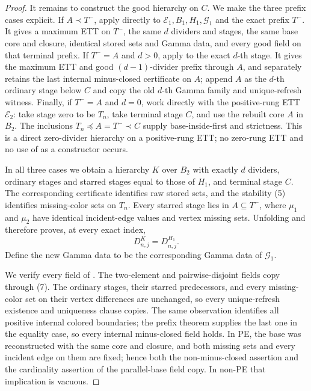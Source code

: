 \begin{proof}
It remains to construct the good hierarchy on $C$.  We make the three
prefix cases explicit.  If $A\prec T^-$, apply directly
 to
$\mathcal E_1,B_1,H_1,\mathcal G_1$ and the exact prefix $T^-$.  It gives
a maximum ETT on $T^-$, the same $d$ dividers and stages, the same base
core and closure, identical stored sets and Gamma data, and every good
field on that terminal prefix.  If $T^-=A$ and $d>0$, apply
 to the exact $d$-th stage.  It
gives the maximum ETT and good $(d-1)$-divider prefix through $A$, and
separately retains the last internal minus-closed certificate on $A$;
append $A$ as the $d$-th ordinary stage below $C$ and copy the old
$d$-th Gamma family and unique-refresh witness.  Finally, if $T^-=A$ and
$d=0$, work directly with the positive-rung ETT $\mathcal E_2$: take
stage zero to be $T_n$, take terminal stage $C$, and use the rebuilt core
$A$ in $B_2$.  The inclusions $T_n\preccurlyeq A=T^-\prec C$ supply
base-inside-first and strictness.  This is a direct zero-divider hierarchy
on a positive-rung ETT; no zero-rung ETT and no use of
 as a constructor occurs.

In all three cases we obtain a hierarchy $K$ over $B_2$ with exactly
$d$ dividers, ordinary stages and starred stages equal to those of $H_1$,
and terminal stage $C$.  The corresponding certificate identifies raw
stored sets, and the stability (5) identifies missing-color sets on
$T_n$.  Every starred stage lies in $A\subseteq T^-$, where $\mu_1$ and
$\mu_2$ have identical incident-edge values and vertex missing sets.
Unfolding  and
 therefore proves, at every exact index,
\[
                 D^K_{n,j}=D^{H_1}_{n,j}.                    \tag{7}
\]
Define the new Gamma data to be the corresponding Gamma data of
$\mathcal G_1$.

We verify every field of .  The two-element and
pairwise-disjoint fields copy through (7).  The ordinary stages, their
starred predecessors, and every missing-color set on their vertex
differences are unchanged, so every unique-refresh existence and
uniqueness clause copies.  The same observation identifies all positive
internal colored boundaries; the prefix theorem supplies the last one in
the equality case, so every internal minus-closed field holds.  In PE,
the base was reconstructed with the same core and closure, and both
missing sets and every incident edge on them are fixed; hence both the
non-minus-closed assertion and the cardinality assertion of the
parallel-base field copy.  In non-PE that implication is vacuous.


\end{proof}
